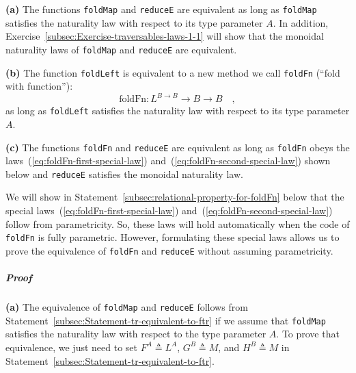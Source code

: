 \textbf{(a)} The functions \lstinline!foldMap! and \lstinline!reduceE!
are equivalent as long as \lstinline!foldMap! satisfies the naturality
law with respect to its type parameter $A$. In addition, Exercise~\ref{subsec:Exercise-traversables-laws-1-1}
will show that the monoidal naturality laws of \lstinline!foldMap!
and \lstinline!reduceE! are equivalent.

\textbf{(b)} The function \lstinline!foldLeft! is equivalent to a
new method we call \lstinline!foldFn! (\textsf{``}fold with function\textsf{''}):
\[
\text{foldFn}:L^{B\rightarrow B}\rightarrow B\rightarrow B\quad,
\]
as long as \lstinline!foldLeft! satisfies the naturality law with
respect to its type parameter $A$.

\textbf{(c)} The functions \lstinline!foldFn! and \lstinline!reduceE!
are equivalent as long as \lstinline!foldFn! obeys the laws~(\ref{eq:foldFn-first-special-law})
and~(\ref{eq:foldFn-second-special-law}) shown below and \lstinline!reduceE!
satisfies the monoidal naturality law. 

We will show in Statement~\ref{subsec:relational-property-for-foldFn}
below that the special laws~(\ref{eq:foldFn-first-special-law})
and~(\ref{eq:foldFn-second-special-law}) follow from parametricity.
So, these laws will hold automatically when the code of \lstinline!foldFn!
is fully parametric. However, formulating these special laws allows
us to prove the equivalence of \lstinline!foldFn! and \lstinline!reduceE!
without assuming parametricity.

\subparagraph{Proof}

\textbf{(a)} The equivalence of \lstinline!foldMap! and \lstinline!reduceE!
follows from Statement~\ref{subsec:Statement-tr-equivalent-to-ftr}
if we assume that \lstinline!foldMap! satisfies the naturality law
with respect to the type parameter $A$. To prove that equivalence,
we just need to set $F^{A}\triangleq L^{A}$, $G^{B}\triangleq M$,
and $H^{B}\triangleq M$ in Statement~\ref{subsec:Statement-tr-equivalent-to-ftr}.

